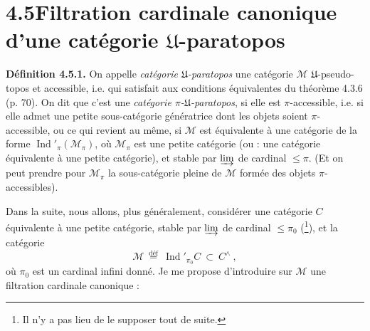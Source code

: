 \documentclass[11pt]{article}
\newcommand{\printedpage}[1]{\marginpar{\footnotesize p.~#1}}
\newcommand{\msp}[1]{\marginpar{\footnotesize [#1]}}
\newcommand{\Ind}{\operatorname{Ind}}
\begin{document}
\setcounter{footnote}{29}

\printedpage{29}

\section*{4.5\quad Filtration cardinale canonique d'une catégorie $\mathfrak{U}$-paratopos}

\textbf{Définition 4.5.1.} On appelle \textit{catégorie $\mathfrak{U}$-paratopos} une catégorie $\mathcal{M}$ $\mathfrak{U}$-pseudo-topos et accessible, i.e. qui satisfait aux conditions équivalentes du théorème 4.3.6 (p. 70). On dit que c'est une \textit{catégorie $\pi$-$\mathfrak{U}$-paratopos}, si elle est $\pi$-accessible, i.e. si elle admet une petite sous-catégorie génératrice dont les objets soient $\pi$-accessible, ou ce qui revient au même, si %
$\mathcal{M}$ est équivalente à une catégorie de la forme $\Ind'_{\pi}(\mathcal{M}_{\pi})$, où $\mathcal{M}_{\pi}$ est une petite catégorie (ou : une catégorie équivalente à une petite catégorie), et stable par $\varinjlim$ de cardinal $\leqslant \pi$. (Et on peut prendre pour $\mathcal{M}_{\pi}$ la sous-catégorie pleine de $\mathcal{M}$ formée des objets
\msp{page 107}
$\pi$-accessibles).

Dans la suite, nous allons, plus généralement, considérer une catégorie $C$ équivalente à une petite catégorie, stable par $\varinjlim$ de cardinal $\leqslant \pi_0$ (\footnote{Il n'y a pas lieu de le supposer tout de suite.}), et la catégorie
\[
\mathcal{M} \ \overset{\text{déf}}{=}\ \Ind'_{\pi_0}C \ \subset\ C^{\wedge}\ ,
\tag*{(4.5.1)}
\]
où $\pi_0$ est un cardinal infini donné. Je me propose d'introduire sur $\mathcal{M}$ une filtration cardinale canonique :
\end{document}
